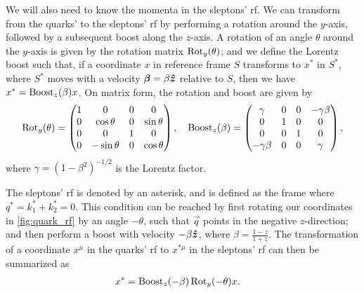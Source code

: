 We will also need to know the momenta in the sleptons' \gls{rf}. We can transform from the quarks' to the sleptons' \gls{rf} by performing a rotation around the $y$-axis, followed by a subsequent boost along the $z$-axis.
A rotation of an angle $\theta$ around the $y$-axis is given by the rotation matrix $\operatorname{Rot}_y(\theta)$; and we define the Lorentz boost such that, if a coordinate $x$ in reference frame $S$ transforms to $x^*$ in $S^*$, where $S^*$ moves with a velocity $\boldsymbol{\beta} = \beta\boldsymbol{\hat{z}}$ relative to $S$, then we have $x^* = \operatorname{Boost}_z(\beta)x$. On matrix form, the rotation and boost are given by
\begin{align}
    \operatorname{Rot}_y(\theta) = \begin{pmatrix}
        1 & 0 & 0 & 0 \\
        0 & \cos\theta & 0 & \sin\theta \\
        0 & 0 & 1 & 0 \\
        0 & -\sin\theta & 0 & \cos\theta
    \end{pmatrix}, \quad
    \operatorname{Boost}_z(\beta) = \begin{pmatrix}
        \gamma & 0 & 0 & -\gamma\beta \\
        0 & 1 & 0 & 0 \\
        0 & 0 & 1 & 0 \\
        -\gamma\beta & 0 & 0 & \gamma
    \end{pmatrix},
\end{align}
where $\gamma = (1-\beta^2)^{-1/2}$ is the Lorentz factor.

The sleptons' \gls{rf} is denoted by an asterisk, and is defined as the frame where $q^*=k_1^*+k_2^*=0$.
This condition can be reached by first rotating our coordinates in \cref{fig:quark_rf} by an angle $-\theta$, such that $\vec{q}$ points in the negative $z$-direction; and then perform a boost with velocity $-\beta\boldsymbol{\hat{z}}$, where $\beta = \frac{1-z}{1+z}$. The transformation of a coordinate $x^\mu$ in the quarks' \gls{rf} to $x^{*\mu}$ in the sleptons' \gls{rf} can then be summarized as
\begin{align}
    x^* &= \operatorname{Boost}_z(-\beta) \operatorname{Rot}_y(-\theta) x.
    \label{eq:quark_to_slepton_transform}
\end{align}


